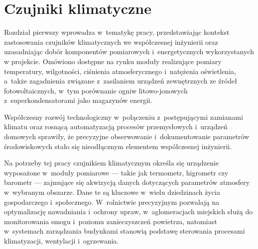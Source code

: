 \chapter{Czujniki klimatyczne}
Rozdział pierwszy wprowadza w~tematykę pracy, przedstawiając kontekst 
zastosowania czujników klimatycznych we współczesnej inżynierii oraz 
uzasadniając dobór komponentów pomiarowych i~energetycznych 
wykorzystanych w projekcie. Omówiono dostępne na rynku moduły 
realizujące pomiary temperatury, wilgotności, ciśnienia 
atmosferycznego i~natężenia oświetlenia, a~także zagadnienia związane 
z~zasilaniem urządzeń zewnętrznych ze źródeł fotowoltaicznych, 
w~tym porównanie ogniw litowo-jonowych z~superkondensatorami jako 
magazynów energii.

Współczesny rozwój technologiczny w~połączeniu z~postępującymi
zamianami klimatu oraz rosnącą automatyzacją procesów 
przemysłowych i~urządzeń domowych sprawiły, że precyzyjne
obserwowanie i~dokumentowanie parametrów środowiskowych stało się
nieodłącznym elementem współczesnej inżynierii.

Na potrzeby tej pracy czujnikiem klimatycznym określa się urządzenie
wyposażone w~moduły pomiarowe --- takie jak termometr, higrometr czy 
barometr --- zajmujące się akwizycją danych
dotyczących parametrów atmosfery w~wybranym obszarze. Dane te są 
kluczowe w~wielu dziedzinach życia gospodarczego i~społecznego. 
W~rolnictwie precyzyjnym  pozwalają 
na optymalizację nawadniania i~ochrony upraw, 
w~aglomeracjach miejskich służą do monitorowania smogu i~poziomu
zanieczyszczeń powietrza, natomiast w~systemach zarządzania 
budynkami  stanowią 
podstawę sterowania procesami klimatyzacji, wentylacji 
i~ogrzewania.

